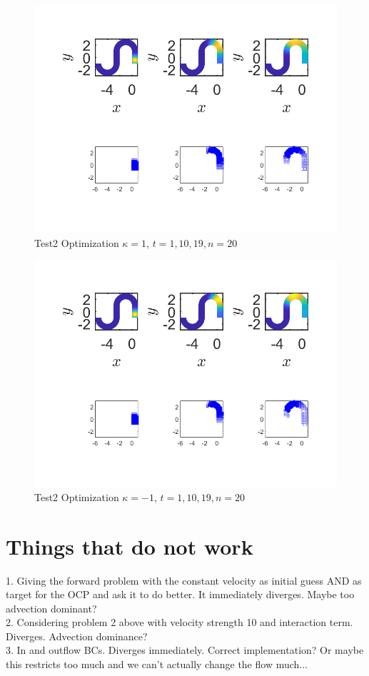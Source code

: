 \documentclass[11pt, a4paper]{article}
\theoremstyle{definition}
\begin{document}
    
    \begin{figure}[h]
    	\centering
    	\includegraphics[scale=0.7]{Test11Optk1.png}
    	\caption{Test2 Optimization $\kappa = 1$, $t =1, 10, 19, n = 20$} 
    	\label{FTest2Optk1}
    \end{figure}
\begin{figure}[h]
	\centering
	\includegraphics[scale=0.7]{Test11Optn1.png}
	\caption{Test2 Optimization $\kappa = -1$, $t =1, 10, 19, n = 20$} 
	\label{FTest2Optn1}
\end{figure}
    
    \section{Things that do not work}
    1. Giving the forward problem with the constant velocity as initial guess AND as target for the OCP and ask it to do better. It immediately diverges. Maybe too advection dominant?\\
    2. Considering problem 2 above with velocity strength 10 and interaction term. Diverges. Advection dominance?\\
    3. In and outflow BCs. Diverges immediately. Correct implementation? Or maybe this restricts too much and we can't actually change the flow much...  
    
\end{document}

